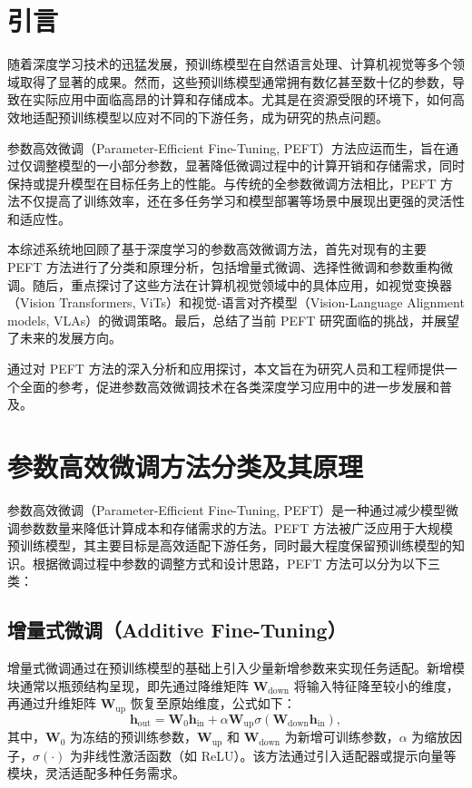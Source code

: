 \documentclass[12pt,a4paper,twoside]{article} %
\begin{document}
\begin{multicols}{2}
\noindent
\section{引言}

随着深度学习技术的迅猛发展，预训练模型在自然语言处理、计算机视觉等多个领域取得了显著的成果。然而，这些预训练模型通常拥有数亿甚至数十亿的参数，导致在实际应用中面临高昂的计算和存储成本。尤其是在资源受限的环境下，如何高效地适配预训练模型以应对不同的下游任务，成为研究的热点问题。

参数高效微调（Parameter-Efficient Fine-Tuning, PEFT）方法应运而生，旨在通过仅调整模型的一小部分参数，显著降低微调过程中的计算开销和存储需求，同时保持或提升模型在目标任务上的性能。与传统的全参数微调方法相比，PEFT 方法不仅提高了训练效率，还在多任务学习和模型部署等场景中展现出更强的灵活性和适应性。

本综述系统地回顾了基于深度学习的参数高效微调方法，首先对现有的主要 PEFT 方法进行了分类和原理分析，包括增量式微调、选择性微调和参数重构微调。随后，重点探讨了这些方法在计算机视觉领域中的具体应用，如视觉变换器（Vision Transformers, ViTs）和视觉-语言对齐模型（Vision-Language Alignment models, VLAs）的微调策略。最后，总结了当前 PEFT 研究面临的挑战，并展望了未来的发展方向。

通过对 PEFT 方法的深入分析和应用探讨，本文旨在为研究人员和工程师提供一个全面的参考，促进参数高效微调技术在各类深度学习应用中的进一步发展和普及。

\section{参数高效微调方法分类及其原理}

参数高效微调（Parameter-Efficient Fine-Tuning, PEFT）是一种通过减少模型微调参数数量来降低计算成本和存储需求的方法。PEFT 方法被广泛应用于大规模预训练模型，其主要目标是高效适配下游任务，同时最大程度保留预训练模型的知识。根据微调过程中参数的调整方式和设计思路，PEFT 方法可以分为以下三类：


\subsection{增量式微调（Additive Fine-Tuning）}
增量式微调通过在预训练模型的基础上引入少量新增参数来实现任务适配。新增模块通常以瓶颈结构呈现，即先通过降维矩阵 $\mathbf{W}_{\text{down}}$ 将输入特征降至较小的维度，再通过升维矩阵 $\mathbf{W}_{\text{up}}$ 恢复至原始维度，公式如下：
\begin{equation}
\mathbf{h}_{\text{out}} = \mathbf{W}_0 \mathbf{h}_{\text{in}} + \alpha \mathbf{W}_{\text{up}} \sigma (\mathbf{W}_{\text{down}} \mathbf{h}_{\text{in}}),
\label{eq:additive}
\end{equation}
其中，$\mathbf{W}_0$ 为冻结的预训练参数，$\mathbf{W}_{\text{up}}$ 和 $\mathbf{W}_{\text{down}}$ 为新增可训练参数，$\alpha$ 为缩放因子，$\sigma(\cdot)$ 为非线性激活函数（如 ReLU）。该方法通过引入适配器或提示向量等模块，灵活适配多种任务需求。


\end{multicols}
\end{document}
